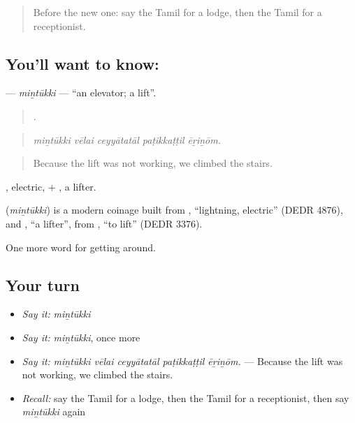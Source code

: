 \label{lesson:TA-C418-mintukki}



\begin{quote}
Before the new one: say the Tamil for a lodge, then the Tamil for a receptionist.
\end{quote}

\subsection*{You'll want to know: }
\textbf{} — \emph{miṉtūkki} — \textquotedblleft{}an elevator; a lift\textquotedblright{}.

\begin{quote}
    .
\end{quote}

\begin{quote}
\emph{miṉtūkki vēlai ceyyātatāl paṭikkaṭṭil ēṟiṉōm.}
\end{quote}

\begin{quote}
Because the lift was not working, we climbed the stairs.
\end{quote}

, electric, + , a lifter.

\begin{cousinweb}
\textbf{} (\emph{miṉtūkki}) is a modern coinage built from , \textquotedblleft{}lightning, electric\textquotedblright{} (DEDR 4876), and , \textquotedblleft{}a lifter\textquotedblright{}, from , \textquotedblleft{}to lift\textquotedblright{} (DEDR 3376).
\end{cousinweb}

\begin{grammarlens}[title={What you've built}]
One more word for getting around.
\end{grammarlens}

\subsection*{Your turn}
\begin{itemize}
\raggedright
  \item \emph{Say it:} \emph{miṉtūkki}
  \item \emph{Say it:} \emph{miṉtūkki}, once more
  \item \emph{Say it:} \emph{miṉtūkki vēlai ceyyātatāl paṭikkaṭṭil ēṟiṉōm.} — Because the lift was not working, we climbed the stairs.
  \item \emph{Recall:} say the Tamil for a lodge, then the Tamil for a receptionist, then say \emph{miṉtūkki} again
\end{itemize}

